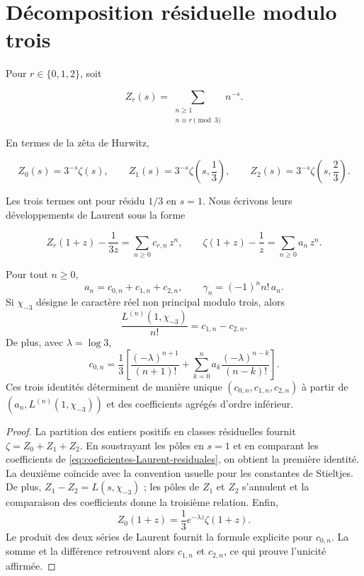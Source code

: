\section{Décomposition résiduelle modulo trois}

Pour $r\in\{0,1,2\}$, soit

\begin{equation}
 Z_r(s)=
 \sum_{\substack{n\geq1\\n\equiv r\pmod3}}n^{-s}.
 \label{eq:canales-residuales-Zr}
\end{equation}

En termes de la zêta de Hurwitz,

\[
 Z_0(s)=3^{-s}\zeta(s),
 \qquad
 Z_1(s)=3^{-s}\zeta\!\left(s,\frac13\right),
 \qquad
 Z_2(s)=3^{-s}\zeta\!\left(s,\frac23\right).
\]

Les trois termes ont pour résidu $1/3$ en $s=1$. Nous écrivons leurs
développements de Laurent sous la forme

\begin{equation}
 Z_r(1+z)-\frac1{3z}=\sum_{n\geq0}c_{r,n}\,z^n,
 \qquad
 \zeta(1+z)-\frac1z=\sum_{n\geq0}a_n\,z^n.
 \label{eq:coeficientes-Laurent-residuales}
\end{equation}

\begin{theorem}
\label{thm:descomposicion-laurent-triadica}
Pour tout $n\geq0$,
\[
 a_n=c_{0,n}+c_{1,n}+c_{2,n},
 \qquad
 \gamma_n=(-1)^n n!\,a_n.
\]
Si $\chi_{-3}$ désigne le caractère réel non principal modulo trois, alors
\[
 \frac{L^{(n)}(1,\chi_{-3})}{n!}=c_{1,n}-c_{2,n}.
\]
De plus, avec \(\lambda=\log3\),
\[
 c_{0,n}=\frac13\left[
 \frac{(-\lambda)^{n+1}}{(n+1)!}
 +\sum_{k=0}^{n}a_k\frac{(-\lambda)^{n-k}}{(n-k)!}
 \right].
\]
Ces trois identités déterminent de manière unique
\((c_{0,n},c_{1,n},c_{2,n})\) à partir de
\((a_n,L^{(n)}(1,\chi_{-3}))\) et des coefficients agrégés d'ordre
inférieur.
\end{theorem}

\begin{proof}
La partition des entiers positifs en classes résiduelles fournit
$\zeta=Z_0+Z_1+Z_2$. En soustrayant les pôles en $s=1$ et en comparant les
coefficients de \eqref{eq:coeficientes-Laurent-residuales}, on obtient la
première identité. La deuxième coïncide avec la convention usuelle pour les
constantes de Stieltjes. De plus,
$Z_1-Z_2=L(s,\chi_{-3})$ ; les pôles de $Z_1$ et $Z_2$ s'annulent et la
comparaison des coefficients donne la troisième relation. Enfin,
\[
 Z_0(1+z)=\frac13e^{-\lambda z}\zeta(1+z).
\]
Le produit des deux séries de Laurent fournit la formule explicite
pour \(c_{0,n}\). La somme et la différence retrouvent alors
\(c_{1,n}\) et \(c_{2,n}\), ce qui prouve l'unicité affirmée.
\end{proof}

